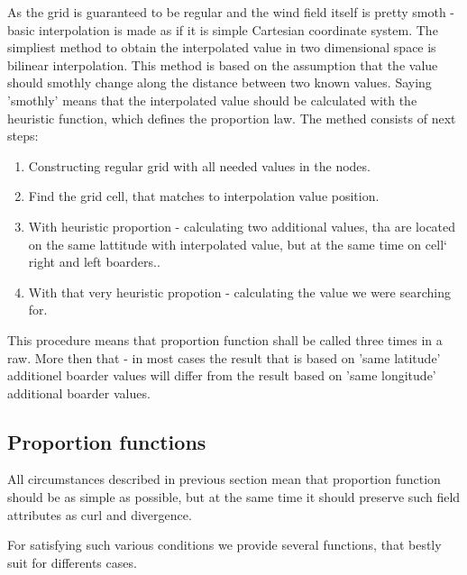 As the grid is guaranteed to be regular and the wind field itself is pretty smoth - basic interpolation is made as if it is simple Cartesian coordinate system. 
The simpliest method to obtain the interpolated value in two dimensional space is bilinear interpolation.
This method is based on the assumption that the value should smothly change along the distance between two known values. 
Saying 'smothly' means that the interpolated value should be calculated with the heuristic function, which defines the proportion law.
The methed consists of next steps:
\begin{enumerate}
 \item Constructing regular grid with all needed values in the nodes.
 \item Find the grid cell, that matches to interpolation value position.
 \item With heuristic proportion - calculating two additional values, tha are located on the same lattitude with interpolated value, but at the same time on cell` right and left boarders..
 \item With that very heuristic propotion - calculating the value we were searching for.
\end{enumerate}

This procedure means that proportion function shall be called three times in a raw. More then that - in most cases the result that is based on 'same latitude' 
additionel boarder values will differ from the result based on 'same longitude' additional boarder values.

\subsection{Proportion functions}

All circumstances described in previous section mean that proportion function should be as simple as possible, but at the same time it should preserve such field attributes 
as curl and divergence.

For satisfying such various conditions we provide several functions, that bestly suit for differents cases.

